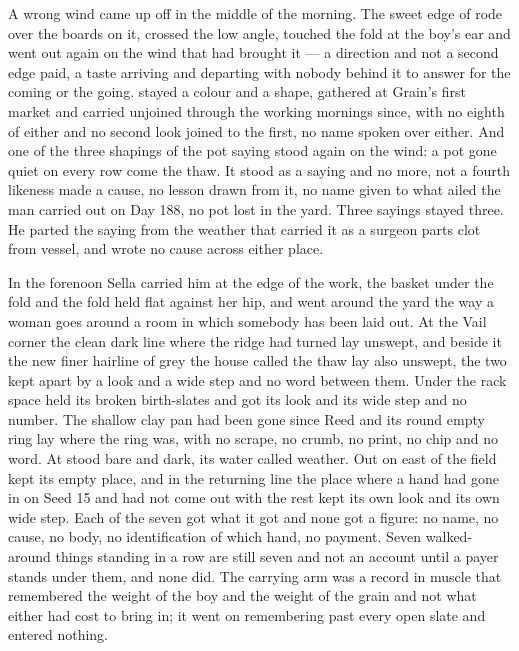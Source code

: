 A wrong wind came up off  in the middle of the morning. The sweet edge of  rode over the boards on it, crossed the low angle, touched the fold at the boy's ear and went out again on the wind that had brought it --- a direction and not a second edge paid, a taste arriving and departing with nobody behind it to answer for the coming or the going.  stayed a colour and  a shape, gathered at Grain's first market and carried unjoined through the working mornings since, with no eighth of either and no second look joined to the first, no name spoken over either. And one of the three shapings of the pot saying stood again on the wind: a pot gone quiet on every row come the thaw. It stood as a saying and no more, not a fourth likeness made a cause, no lesson drawn from it, no name given to what ailed the man carried out on Day 188, no pot lost in the yard. Three sayings stayed three. He parted the saying from the weather that carried it as a surgeon parts clot from vessel, and wrote no cause across either place.

\scenebreak

In the forenoon Sella carried him at the edge of the work, the basket under the fold and the fold held flat against her hip, and went around the yard the way a woman goes around a room in which somebody has been laid out. At the Vail corner the clean dark line where the  ridge had turned lay unswept, and beside it the new finer hairline of grey the house called the thaw lay also unswept, the two kept apart by a look and a wide step and no word between them. Under  the rack space held its broken birth-slates and got its look and its wide step and no number. The shallow clay pan had been gone since Reed and its round empty ring lay where the ring was, with no scrape, no crumb, no print, no chip and no word. At   stood bare and dark, its water called weather. Out on  east of  the field kept its empty place, and in the returning line the place where a hand had gone in on Seed 15 and had not come out with the rest kept its own look and its own wide step. Each of the seven got what it got and none got a figure: no name, no cause, no body, no identification of which hand, no payment. Seven walked-around things standing in a row are still seven and not an account until a payer stands under them, and none did. The carrying arm was a record in muscle that remembered the weight of the boy and the weight of the grain and not what either had cost to bring in; it went on remembering past every open slate and entered nothing.

